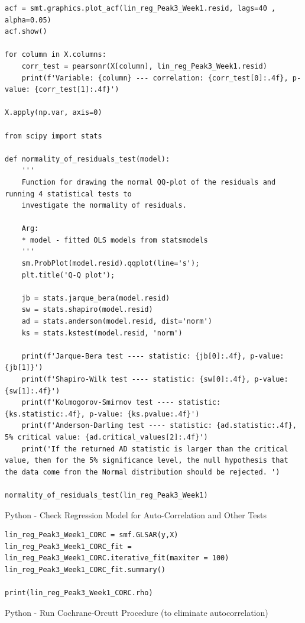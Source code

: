 \documentclass[12pt]{scrartcl}
\begin{document}
\begin{listing}[H]
\begin{verbatim}
acf = smt.graphics.plot_acf(lin_reg_Peak3_Week1.resid, lags=40 , alpha=0.05)
acf.show()

for column in X.columns:
    corr_test = pearsonr(X[column], lin_reg_Peak3_Week1.resid)
    print(f'Variable: {column} --- correlation: {corr_test[0]:.4f}, p-value: {corr_test[1]:.4f}')
    
X.apply(np.var, axis=0)

from scipy import stats

def normality_of_residuals_test(model):
    '''
    Function for drawing the normal QQ-plot of the residuals and running 4 statistical tests to 
    investigate the normality of residuals.
    
    Arg:
    * model - fitted OLS models from statsmodels
    '''
    sm.ProbPlot(model.resid).qqplot(line='s');
    plt.title('Q-Q plot');

    jb = stats.jarque_bera(model.resid)
    sw = stats.shapiro(model.resid)
    ad = stats.anderson(model.resid, dist='norm')
    ks = stats.kstest(model.resid, 'norm')
    
    print(f'Jarque-Bera test ---- statistic: {jb[0]:.4f}, p-value: {jb[1]}')
    print(f'Shapiro-Wilk test ---- statistic: {sw[0]:.4f}, p-value: {sw[1]:.4f}')
    print(f'Kolmogorov-Smirnov test ---- statistic: {ks.statistic:.4f}, p-value: {ks.pvalue:.4f}')
    print(f'Anderson-Darling test ---- statistic: {ad.statistic:.4f}, 5% critical value: {ad.critical_values[2]:.4f}')
    print('If the returned AD statistic is larger than the critical value, then for the 5% significance level, the null hypothesis that the data come from the Normal distribution should be rejected. ')
    
normality_of_residuals_test(lin_reg_Peak3_Week1)

\end{verbatim}
\caption{Python - Check Regression Model for Auto-Correlation and Other Tests}
\label{list:[Python - Check Regression Model for Auto-Correlation and Other Tests]}
\end{listing}


\begin{listing}[H]
\begin{verbatim}
lin_reg_Peak3_Week1_CORC = smf.GLSAR(y,X)
lin_reg_Peak3_Week1_CORC_fit = lin_reg_Peak3_Week1_CORC.iterative_fit(maxiter = 100)
lin_reg_Peak3_Week1_CORC_fit.summary()

print(lin_reg_Peak3_Week1_CORC.rho) 

\end{verbatim}
\caption{Python - Run Cochrane-Orcutt Procedure (to eliminate autocorrelation)}
\label{list:[Python - Run Cochrane-Orcutt Procedure (to eliminate autocorrelation)]}
\end{listing}
\end{document}
